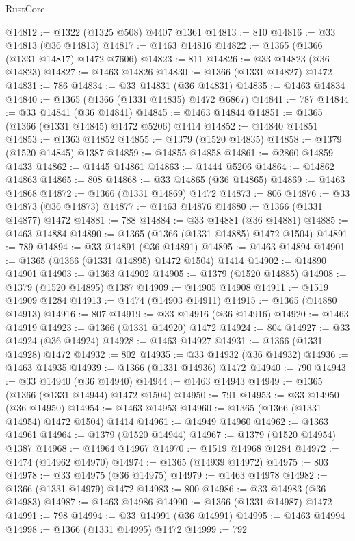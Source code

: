 \begin{lexlean}{RustCore}
\begin{coremodule}
@14812 := @1322 (@1325 @508) @4407 @1361
@14813 := 810
@14816 := @33 @14813 (@36 @14813)
@14817 := @1463 @14816
@14822 := @1365 (@1366 (@1331 @14817) @1472 @7606)
@14823 := 811
@14826 := @33 @14823 (@36 @14823)
@14827 := @1463 @14826
@14830 := @1366 (@1331 @14827) @1472
@14831 := 786
@14834 := @33 @14831 (@36 @14831)
@14835 := @1463 @14834
@14840 := @1365 (@1366 (@1331 @14835) @1472 @6867)
@14841 := 787
@14844 := @33 @14841 (@36 @14841)
@14845 := @1463 @14844
@14851 := @1365 (@1366 (@1331 @14845) @1472 @5206) @1414
@14852 := @14840 @14851
@14853 := @1363 @14852
@14855 := @1379 (@1520 @14835)
@14858 := @1379 (@1520 @14845) @1387
@14859 := @14855 @14858
@14861 := @2860 @14859 @1433
@14862 := @1445 @14861
@14863 := @1444 @5206
@14864 := @14862 @14863
@14865 := 808
@14868 := @33 @14865 (@36 @14865)
@14869 := @1463 @14868
@14872 := @1366 (@1331 @14869) @1472
@14873 := 806
@14876 := @33 @14873 (@36 @14873)
@14877 := @1463 @14876
@14880 := @1366 (@1331 @14877) @1472
@14881 := 788
@14884 := @33 @14881 (@36 @14881)
@14885 := @1463 @14884
@14890 := @1365 (@1366 (@1331 @14885) @1472 @1504)
@14891 := 789
@14894 := @33 @14891 (@36 @14891)
@14895 := @1463 @14894
@14901 := @1365 (@1366 (@1331 @14895) @1472 @1504) @1414
@14902 := @14890 @14901
@14903 := @1363 @14902
@14905 := @1379 (@1520 @14885)
@14908 := @1379 (@1520 @14895) @1387
@14909 := @14905 @14908
@14911 := @1519 @14909 @1284
@14913 := @1474 (@14903 @14911)
@14915 := @1365 (@14880 @14913)
@14916 := 807
@14919 := @33 @14916 (@36 @14916)
@14920 := @1463 @14919
@14923 := @1366 (@1331 @14920) @1472
@14924 := 804
@14927 := @33 @14924 (@36 @14924)
@14928 := @1463 @14927
@14931 := @1366 (@1331 @14928) @1472
@14932 := 802
@14935 := @33 @14932 (@36 @14932)
@14936 := @1463 @14935
@14939 := @1366 (@1331 @14936) @1472
@14940 := 790
@14943 := @33 @14940 (@36 @14940)
@14944 := @1463 @14943
@14949 := @1365 (@1366 (@1331 @14944) @1472 @1504)
@14950 := 791
@14953 := @33 @14950 (@36 @14950)
@14954 := @1463 @14953
@14960 := @1365 (@1366 (@1331 @14954) @1472 @1504) @1414
@14961 := @14949 @14960
@14962 := @1363 @14961
@14964 := @1379 (@1520 @14944)
@14967 := @1379 (@1520 @14954) @1387
@14968 := @14964 @14967
@14970 := @1519 @14968 @1284
@14972 := @1474 (@14962 @14970)
@14974 := @1365 (@14939 @14972)
@14975 := 803
@14978 := @33 @14975 (@36 @14975)
@14979 := @1463 @14978
@14982 := @1366 (@1331 @14979) @1472
@14983 := 800
@14986 := @33 @14983 (@36 @14983)
@14987 := @1463 @14986
@14990 := @1366 (@1331 @14987) @1472
@14991 := 798
@14994 := @33 @14991 (@36 @14991)
@14995 := @1463 @14994
@14998 := @1366 (@1331 @14995) @1472
@14999 := 792

\end{coremodule}
\end{lexlean}
